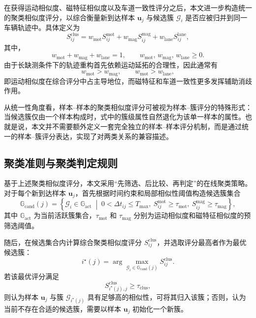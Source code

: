 \documentclass{xdupgthesis}
\begin{document}
在获得运动相似度、磁特征相似度以及车道一致性评分之后，本文进一步构造统一的聚类相似度评分，以综合衡量新到达样本 $\mathbf{u}_j$ 与候选簇 $\mathcal{G}_i$ 是否应被归并到同一车辆轨迹中。具体定义为
\begin{equation}
	S_{ij}^{\mathrm{clus}}
	=
	w_{\mathrm{mot}}S_{ij}^{\mathrm{mot}}
	+
	w_{\mathrm{mag}}S_{ij}^{\mathrm{mag}}
	+
	w_{\mathrm{lane}}S_{ij}^{\mathrm{lane}},
\end{equation}
其中，
\begin{equation}
	w_{\mathrm{mot}}+w_{\mathrm{mag}}+w_{\mathrm{lane}}=1,\qquad
	w_{\mathrm{mot}},\,w_{\mathrm{mag}},\,w_{\mathrm{lane}}\ge 0.
\end{equation}
由于长缺测条件下的轨迹重构首先依赖运动延拓的合理性，因此通常有
\begin{equation}
	w_{\mathrm{mot}} > w_{\mathrm{mag}}, \qquad
	w_{\mathrm{mot}} > w_{\mathrm{lane}},
\end{equation}
即运动相似度在综合评分中占主导地位，而磁特征和车道一致性更多发挥辅助消歧作用。

从统一性角度看，样本--样本的聚类相似度评分可被视为样本--簇评分的特殊形式：当候选簇仅由一个样本构成时，式中的簇级属性自然退化为该单一样本的属性。也就是说，本文并不需要额外定义一套完全独立的样本--样本评分机制，而是通过统一的样本--簇评分表达，实现了对两类关系的兼容描述。

\subsection{聚类准则与聚类判定规则}

基于上述聚类相似度评分，本文采用“先筛选、后比较、再判定”的在线聚类策略。对于每个新到达样本 $\mathbf{u}_j$，首先根据时间约束和局部相似性阈值构造候选簇集合
\begin{equation}
	\mathbb{G}_{\mathrm{cand}}(j)
	=
	\left\{
	\mathcal{G}_i\in\mathbb{G}_{\mathrm{act}}
	\;\middle|\;
	0<\Delta t_{ij}\le T_{\max},\
	S_{ij}^{\mathrm{mot}}\ge \tau_{\mathrm{mot}},\
	S_{ij}^{\mathrm{mag}}\ge \tau_{\mathrm{mag}}
	\right\},
\end{equation}
其中 $\mathbb{G}_{\mathrm{act}}$ 为当前活跃簇集合，$\tau_{\mathrm{mot}}$ 和 $\tau_{\mathrm{mag}}$ 分别为运动相似度和磁特征相似度的预筛选阈值。

随后，在候选集合内计算综合聚类相似度评分 $S_{ij}^{\mathrm{clus}}$，并选取评分最高者作为最优候选簇：
\begin{equation}
	i^{\star}(j)
	=
	\arg\max_{\mathcal{G}_i\in\mathbb{G}_{\mathrm{cand}}(j)}
	S_{ij}^{\mathrm{clus}}.
\end{equation}
若该最优评分满足
\begin{equation}
	S_{i^{\star}(j),j}^{\mathrm{clus}} \ge \tau_{\mathrm{clus}},
\end{equation}
则认为样本 $\mathbf{u}_j$ 与簇 $\mathcal{G}_{i^{\star}(j)}$ 具有足够高的相似性，可将其归入该簇；否则，认为当前不存在合适的候选簇，需要以样本 $\mathbf{u}_j$ 初始化一个新簇。
\end{document}
